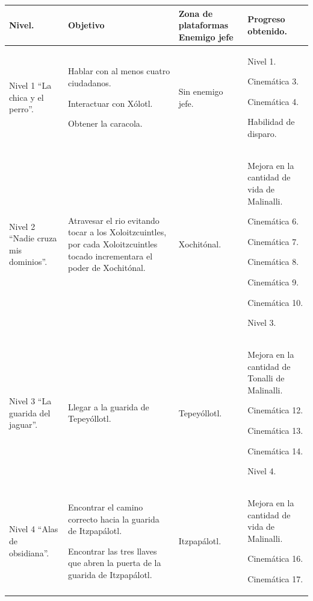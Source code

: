 	\begin{longtable}[c]{ | m{3.75cm} | m{3.75cm}| m{3.75cm} | m{3.75cm}|} 
		\rowcolor{cyan} Nivel.& Objetivo & Zona de plataformas	Enemigo jefe & Progreso obtenido. \\ 
		\hline
		Nivel 1 “La chica y el perro”. & 
		Hablar con al menos cuatro ciudadanos.
			\par 
			Interactuar con Xólotl.
			\par 
			Obtener la caracola.&
		Sin enemigo jefe.&
		 Nivel 1.
			\par 
			Cinemática 3.
			\par 
			Cinemática 4.
			\par 
			Habilidad de disparo.		 
		 \\ 
		\hline
		Nivel 2 “Nadie cruza mis dominios”. & 
		Atravesar el rio evitando tocar a los Xoloitzcuintles, por cada Xoloitzcuintles tocado incrementara el poder de Xochitónal. &
		Xochitónal. &
		Mejora en la cantidad de vida de Malinalli.
			\par 
			Cinemática 6.
			\par 
			Cinemática 7.
			\par 
			Cinemática 8.
			\par 
			Cinemática 9.
			\par 
			Cinemática 10.
			\par 
			Nivel 3.		 
		 \\ 
		\hline
		Nivel 3 “La guarida del jaguar”. & 
		Llegar a la guarida de Tepeyóllotl. &
		Tepeyóllotl. &
		Mejora en la cantidad de Tonalli de Malinalli.
			\par 
			Cinemática 12.
			\par
			Cinemática 13.
			\par 
			Cinemática 14.
			\par
			Nivel 4.		 
		 \\ 
		\hline
		Nivel 4 “Alas de obsidiana”. & 
			Encontrar el camino correcto hacia la guarida de Itzpapálotl.
			\par
			Encontrar las tres llaves que abren la puerta de la guarida de Itzpapálotl.&
		Itzpapálotl. &
			 Mejora en la cantidad de vida de Malinalli.
			 \par
			 Cinemática 16.
			 \par
			 Cinemática 17.
			 \par

\end{longtable}

